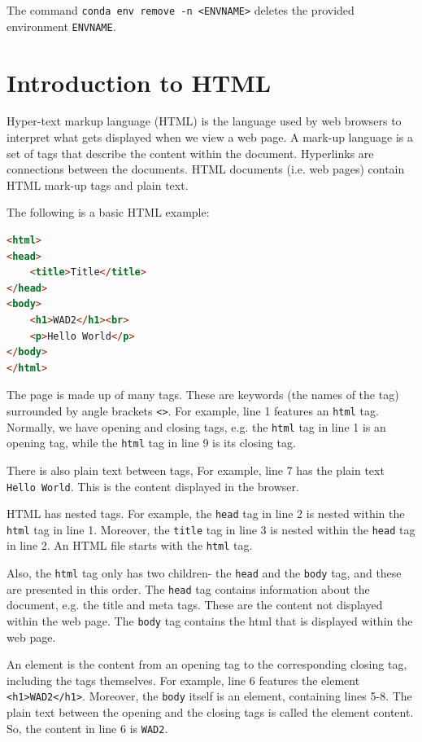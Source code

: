 \documentclass[a4paper, openany]{memoir}
\begin{document}
    The command \texttt{conda env remove -n <ENVNAME>} deletes the provided environment \texttt{ENVNAME}.
    \newpage

    \section{Introduction to HTML}
    Hyper-text markup language (HTML) is the language used by web browsers to interpret what gets displayed when we view a web page. A mark-up language is a set of tags that describe the content within the document. Hyperlinks are connections between the documents. HTML documents (i.e. web pages) contain HTML mark-up tags and plain text.

    The following is a basic HTML example:
\begin{lstlisting}[language=html]
<html>
<head>
    <title>Title</title>
</head>
<body>
    <h1>WAD2</h1><br>
    <p>Hello World</p>
</body>
</html>
\end{lstlisting}
    The page is made up of many tags. These are keywords (the names of the tag) surrounded by angle brackets \texttt{<>}. For example, line 1 features an \texttt{html} tag. Normally, we have opening and closing tags, e.g. the \texttt{html} tag in line 1 is an opening tag, while the \texttt{html} tag in line 9 is its closing tag.

    There is also plain text between tags, For example, line 7 has the plain text \texttt{Hello World}. This is the content displayed in the browser.

    HTML has nested tags. For example, the \texttt{head} tag in line 2 is nested within the \texttt{html} tag in line 1. Moreover, the \texttt{title} tag in line 3 is nested within the \texttt{head} tag in line 2. An HTML file starts with the \texttt{html} tag.

    Also, the \texttt{html} tag only has two children- the \texttt{head} and the \texttt{body} tag, and these are presented in this order. The \texttt{head} tag contains information about the document, e.g. the title and meta tags. These are the content not displayed within the web page. The \texttt{body} tag contains the html that is displayed within the web page.

    An element is the content from an opening tag to the corresponding closing tag, including the tags themselves. For example, line 6 features the element \texttt{<h1>WAD2</h1>}. Moreover, the \texttt{body} itself is an element, containing lines 5-8. The plain text between the opening and the closing tags is called the element content. So, the content in line 6 is \texttt{WAD2}.
\end{document}
